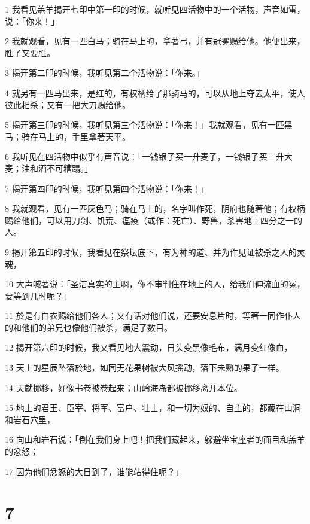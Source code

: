 \par 1 我看见羔羊揭开七印中第一印的时候，就听见四活物中的一个活物，声音如雷，说：「你来！」
\par 2 我就观看，见有一匹白马；骑在马上的，拿著弓，并有冠冕赐给他。他便出来，胜了又要胜。
\par 3 揭开第二印的时候，我听见第二个活物说：「你来。」
\par 4 就另有一匹马出来，是红的，有权柄给了那骑马的，可以从地上夺去太平，使人彼此相杀；又有一把大刀赐给他。
\par 5 揭开第三印的时候，我听见第三个活物说：「你来！」我就观看，见有一匹黑马；骑在马上的，手里拿著天平。
\par 6 我听见在四活物中似乎有声音说：「一钱银子买一升麦子，一钱银子买三升大麦；油和酒不可糟蹋。」
\par 7 揭开第四印的时候，我听见第四个活物说：「你来！」
\par 8 我就观看，见有一匹灰色马；骑在马上的，名字叫作死，阴府也随著他；有权柄赐给他们，可以用刀剑、饥荒、瘟疫（或作：死亡）、野兽，杀害地上四分之一的人。
\par 9 揭开第五印的时候，我看见在祭坛底下，有为神的道、并为作见证被杀之人的灵魂，
\par 10 大声喊著说：「圣洁真实的主啊，你不审判住在地上的人，给我们伸流血的冤，要等到几时呢？」
\par 11 於是有白衣赐给他们各人；又有话对他们说，还要安息片时，等著一同作仆人的和他们的弟兄也像他们被杀，满足了数目。
\par 12 揭开第六印的时候，我又看见地大震动，日头变黑像毛布，满月变红像血，
\par 13 天上的星辰坠落於地，如同无花果树被大风摇动，落下未熟的果子一样。
\par 14 天就挪移，好像书卷被卷起来；山岭海岛都被挪移离开本位。
\par 15 地上的君王、臣宰、将军、富户、壮士，和一切为奴的、自主的，都藏在山洞和岩石穴里，
\par 16 向山和岩石说：「倒在我们身上吧！把我们藏起来，躲避坐宝座者的面目和羔羊的忿怒；
\par 17 因为他们忿怒的大日到了，谁能站得住呢？」

\chapter{7}

